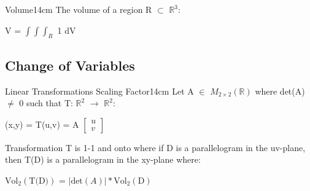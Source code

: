     \begin{definition}{Volume}{14cm}
        The {\color{lblue} volume} of a region R $\subset$ $\mathbb{R}^3$:

        \hspace{0.5cm}
        V = $\int \int \int_R$ 1 dV
    \end{definition}

    \newpage





\subsection{ Change of Variables }

    \begin{wtheorem}{Linear Transformations Scaling Factor}{14cm}
        Let A $\in$ $M_{2 \times 2}(\mathbb{R})$ where det(A) $\not =$ 0
        such that T: $\mathbb{R}^2$ $\rightarrow$ $\mathbb{R}^2$:

        \hspace{0.5cm}
        (x,y) = T(u,v) = A
        $
        \begin{bmatrix}
            u \\
            v
        \end{bmatrix}
        $

        Transformation T is 1-1 and onto where if D is a parallelogram in the
        uv-plane, then T(D) is a parallelogram in the xy-plane where:

        \hspace{0.5cm}
        $\text{Vol}_2(\text{T(D)})$ = $|\text{det}(A)| * \text{Vol}_2(\text{D})$
    \end{wtheorem}


